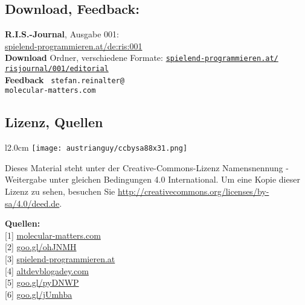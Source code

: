 \subsection*{Download, Feedback:}
\textbf{R.I.S.-Journal}, Ausgabe 001: \\
\href{http://spielend-programmieren.at/de:ris:001}{spielend-programmieren.at/de:ris:001}\\
\textbf{Download} Ordner, verschiedene Formate: \href{http://spielend-programmieren.at/risjournal/001/editorial}{\texttt{spielend-programmieren.at/\\risjournal/001/editorial}} \\
\textbf{Feedback} \Letter\ \texttt{stefan.reinalter@\\molecular-matters.com}\\
                                   

\subsection*{Lizenz, Quellen}
\begin{wrapfigure}{l}{2.0cm}
\texttt{[image: austrianguy/ccbysa88x31.png]}
\end{wrapfigure}
Dieses Material steht unter der Creative-Commons-Lizenz Namensnennung - Weitergabe unter gleichen Bedingungen 4.0 International. Um eine Kopie dieser Lizenz zu sehen, besuchen Sie \url{http://creativecommons.org/licenses/by-sa/4.0/deed.de}.

\textbf{Quellen:} \\
{[}1{]} \href{http://www.molecular-matters.com}{molecular-matters.com} \\
{[}2{]} \href{http://www.altdevblogaday.com/2011/09/27/how-the-austrian-guy-ended-up-working-in-the-games-industry/}{goo.gl/ohJNMH} \\
{[}3{]} \href{http://spielend-programmieren.at}{spielend-programmieren.at} \\
{[}4{]} \href{http://www.altdevblogaday.com/}{altdevblogadey.com} \\
{[}5{]} \href{https://commons.wikimedia.org/wiki/File:Commodore64.jpg}{goo.gl/pyDNWP} \\
{[}6{]} \href{http://www.cg.tuwien.ac.at/courses/CG23/HallOfFame/2004/}{goo.gl/jUmhba} \\










 

